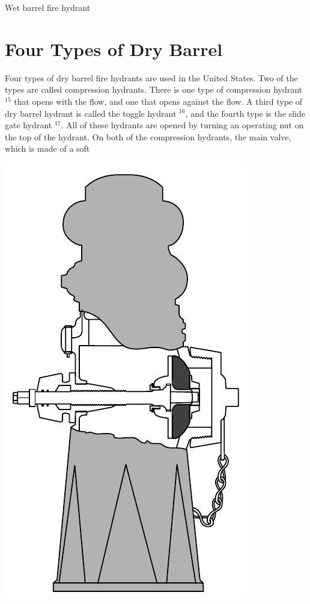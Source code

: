 \documentclass[10pt]{article}
\begin{document}
Wet barrel fire hydrant

\section{Four Types of Dry Barrel}
Four types of dry barrel fire hydrants are used in the United States. Two of the types are called compression hydrants. There is one type of compression hydrant ${ }^{15}$ that opens with the flow, and one that opens against the flow. A third type of dry barrel hydrant is called the toggle hydrant ${ }^{16}$, and the fourth type is the slide gate hydrant ${ }^{17}$. All of these hydrants are opened by turning an operating nut on the top of the hydrant. On both of the compression hydrants, the main valve, which is made of a soft

\includegraphics[max width=\textwidth]{DrybarrellFireHydrant1}
\end{document}
